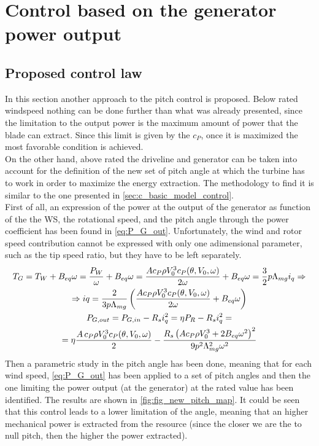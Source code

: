 \section{Control based on the generator power output}\label{sec:control_P_GE}
\subsection{Proposed control law}\label{subsec:method_control_P_GE}
In this section another approach to the pitch control is proposed. 
Below rated windspeed nothing can be done further than what was already presented, since the limitation to the output power is the maximum amount of power that the blade can extract. Since this limit is given by the $c_P$, once it is maximized the most favorable condition is achieved. \\
On the other hand, above rated the driveline and generator can be taken into account for the definition of the new set of pitch angle at which the turbine has to work in order to maximize the energy extraction. The methodology to find it is similar to the one presented in \autoref{sec:c_basic_model_control}.  \\
First of all, an expression of the power at the output of the generator as function of the the WS, the rotational speed, and the pitch angle through the power coefficient has been found in \autoref{eq:P_G_out}.  Unfortunately, the wind and rotor speed contribution cannot be expressed with only one adimensional parameter, such as the tip speed ratio, but they have to be left separately. 
\begin{gather} 
  T_G = T_W + B_{eq}\omega = \frac{P_W}{\omega} + B_{eq}\omega = \frac{A c_P \rho V_0^3 c_P(\theta, V_0, \omega)}{2\omega} + B_{eq}\omega = \frac{3}{2}p\Lambda_{mg}i_q \Rightarrow \\ \notag
  \Rightarrow iq = \frac{2}{3p\Lambda_{mg}}\left(\frac{A c_P \rho V_0^3 c_P(\theta, V_0, \omega)}{2\omega} + B_{eq}\omega\right) \\ 
  P_{G, out} = P_{G, in} - R_s i_q^2 = \eta P_R - R_s i_q^2 = \\ \notag
   = \eta \frac{A \, c_P \rho V_0^3 c_P(\theta, V_0, \omega)}{2} - \frac{R_s \left(A c_P \rho V_0^3 + 2 B_{eq}\omega^2 \right)^2}{9p^2\Lambda_{mg}^2\omega^2} \label{eq:P_G_out} 
\end{gather}
Then a parametric study in the pitch angle has been done, meaning that for each wind speed, \autoref{eq:P_G_out} has been applied to a set of pitch angles and then the one limiting the power output (at the generator) at the rated value has been identified. The results are shown in \autoref{fig:fig_new_pitch_map}. It could be seen that this control leads to a lower limitation of the angle, meaning that an higher mechanical power is extracted from the resource (since the closer we are the to null pitch, then the higher the power extracted).
